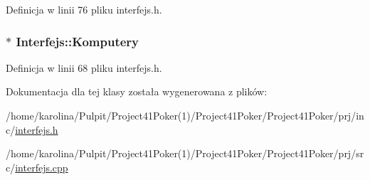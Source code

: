 Definicja w linii 76 pliku interfejs.\-h.

\hypertarget{class_interfejs_a81d63adb225efb2fb0c97f81841156b3}{
\subsubsection[{Komputery}]{$\ast$ Interfejs\-::\-Komputery}}\label{class_interfejs_a81d63adb225efb2fb0c97f81841156b3}


Definicja w linii 68 pliku interfejs.\-h.



Dokumentacja dla tej klasy została wygenerowana z plików\-:\begin{DoxyCompactItemize}
\item 
/home/karolina/\-Pulpit/\-Project41\-Poker(1)/\-Project41\-Poker/\-Project41\-Poker/prj/inc/\hyperlink{interfejs_8h}{interfejs.\-h}\item 
/home/karolina/\-Pulpit/\-Project41\-Poker(1)/\-Project41\-Poker/\-Project41\-Poker/prj/src/\hyperlink{interfejs_8cpp}{interfejs.\-cpp}\end{DoxyCompactItemize}
